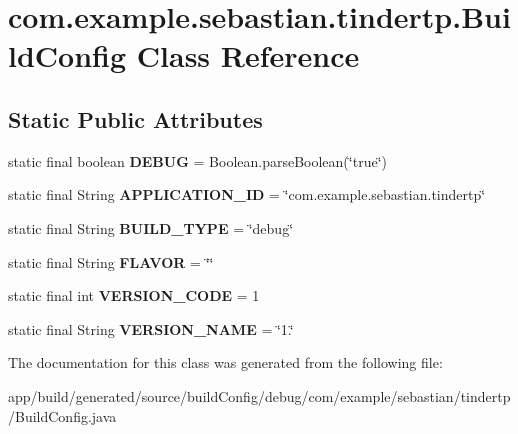 \hypertarget{classcom_1_1example_1_1sebastian_1_1tindertp_1_1BuildConfig}{}\section{com.\+example.\+sebastian.\+tindertp.\+Build\+Config Class Reference}
\label{classcom_1_1example_1_1sebastian_1_1tindertp_1_1BuildConfig}
\subsection*{Static Public Attributes}
\begin{DoxyCompactItemize}
\item 
static final boolean {\bfseries D\+E\+B\+UG} = Boolean.\+parse\+Boolean(\char`\"{}true\char`\"{})\hypertarget{classcom_1_1example_1_1sebastian_1_1tindertp_1_1BuildConfig_ac6d3cd54a50a88e9f568ea1049e83ec4}{}\label{classcom_1_1example_1_1sebastian_1_1tindertp_1_1BuildConfig_ac6d3cd54a50a88e9f568ea1049e83ec4}

\item 
static final String {\bfseries A\+P\+P\+L\+I\+C\+A\+T\+I\+O\+N\+\_\+\+ID} = \char`\"{}com.\+example.\+sebastian.\+tindertp\char`\"{}\hypertarget{classcom_1_1example_1_1sebastian_1_1tindertp_1_1BuildConfig_a403caa3d96f229f96f2d0e148c102592}{}\label{classcom_1_1example_1_1sebastian_1_1tindertp_1_1BuildConfig_a403caa3d96f229f96f2d0e148c102592}

\item 
static final String {\bfseries B\+U\+I\+L\+D\+\_\+\+T\+Y\+PE} = \char`\"{}debug\char`\"{}\hypertarget{classcom_1_1example_1_1sebastian_1_1tindertp_1_1BuildConfig_af9b71be911e210e5c56fb4c74a69f727}{}\label{classcom_1_1example_1_1sebastian_1_1tindertp_1_1BuildConfig_af9b71be911e210e5c56fb4c74a69f727}

\item 
static final String {\bfseries F\+L\+A\+V\+OR} = \char`\"{}\char`\"{}\hypertarget{classcom_1_1example_1_1sebastian_1_1tindertp_1_1BuildConfig_a266551a4a77f8394a4a560ae09a36162}{}\label{classcom_1_1example_1_1sebastian_1_1tindertp_1_1BuildConfig_a266551a4a77f8394a4a560ae09a36162}

\item 
static final int {\bfseries V\+E\+R\+S\+I\+O\+N\+\_\+\+C\+O\+DE} = 1\hypertarget{classcom_1_1example_1_1sebastian_1_1tindertp_1_1BuildConfig_acc3d1ac4289298c000c47bfe0d9e89aa}{}\label{classcom_1_1example_1_1sebastian_1_1tindertp_1_1BuildConfig_acc3d1ac4289298c000c47bfe0d9e89aa}

\item 
static final String {\bfseries V\+E\+R\+S\+I\+O\+N\+\_\+\+N\+A\+ME} = \char`\"{}1.\char`\"{}\hypertarget{classcom_1_1example_1_1sebastian_1_1tindertp_1_1BuildConfig_af1de9fa29e1289802df1cde422b2c03d}{}\label{classcom_1_1example_1_1sebastian_1_1tindertp_1_1BuildConfig_af1de9fa29e1289802df1cde422b2c03d}

\end{DoxyCompactItemize}


The documentation for this class was generated from the following file\+:\begin{DoxyCompactItemize}
\item 
app/build/generated/source/build\+Config/debug/com/example/sebastian/tindertp/Build\+Config.\+java\end{DoxyCompactItemize}
